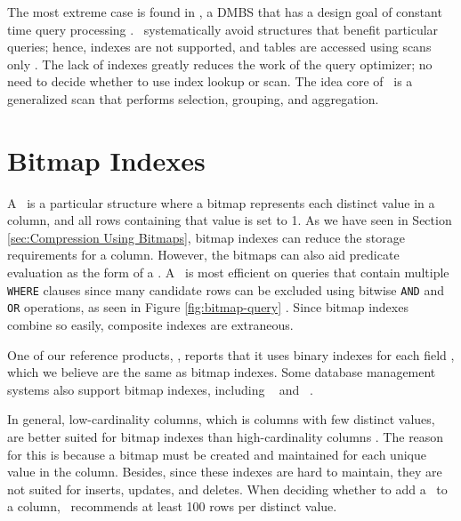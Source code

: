 The most extreme case is found in \blink, a DMBS that has a design goal of constant time query processing \cite{Raman2008-gi}. \blink~systematically avoid structures that benefit particular queries; hence, indexes are not supported, and tables are accessed using scans only \cite{Barber2012-xt}. The lack of indexes greatly reduces the work of the query optimizer; no need to decide whether to use index lookup or scan. The idea core of \blink~is a generalized scan that performs selection, grouping, and aggregation. 

\section{Bitmap Indexes}
\label{sec:Bitmap Indexes}


A \biti~is a particular structure where a bitmap represents each distinct value in a column, and all rows containing that value is set to 1. As we have seen in Section \ref{sec:Compression Using Bitmaps}, bitmap indexes can reduce the storage requirements for a column. However, the bitmaps can also aid predicate evaluation as the form of a \biti. A \biti~is most efficient on queries that contain multiple \texttt{WHERE} clauses since many candidate rows can be excluded using bitwise \texttt{AND} and \texttt{OR} operations, as seen in Figure \ref{fig:bitmap-query} \cite{noauthor_undated-hp}. Since bitmap indexes combine so easily, composite indexes are extraneous. 

One of our reference products, \qlikview, reports that it uses binary indexes for each field \cite{Qlik2011-ef}, which we believe are the same as bitmap indexes. Some database management systems also support bitmap indexes, including \oracle~\cite{noauthor_undated-hp} and \ibm~\cite{Raman2013-em}.

In general, low-cardinality columns, which is columns with few distinct values, are better suited for bitmap indexes than high-cardinality columns \cite{noauthor_undated-hp}. The reason for this is because a bitmap must be created and maintained for each unique value in the column. Besides, since these indexes are hard to maintain, they are not suited for inserts, updates, and deletes. When deciding whether to add a \biti~to a column, \oracle~recommends at least 100 rows per distinct value. 

